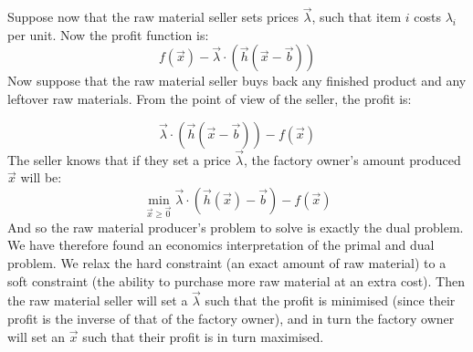\documentclass[../Main.tex]{subfiles}
\begin{document}
\begin{example}
    Suppose now that the raw material seller sets prices $\vec{\lambda}$, such that item $i$ costs $\lambda_i$ per unit. Now the profit function is:
    \begin{equation*}
        f(\vec{x}) - \vec{\lambda} \cdot (\vec{h}(\vec{x} - \vec{b}))
    \end{equation*}
    Now suppose that the raw material seller buys back any finished product and any leftover raw materials. From the point of view of the seller, the profit is:

    \begin{equation*}
        \vec{\lambda} \cdot (\vec{h}(\vec{x} - \vec{b})) - f(\vec{x})
    \end{equation*}
    The seller knows that if they set a price $\vec{\lambda}$, the factory owner's amount produced $\vec{x}$ will be:
    \begin{equation*}
        \min_{\vec{x} \geq \vec{0}} \vec{\lambda} \cdot (\vec{h}(\vec{x}) - \vec{b}) - f(\vec{x})
    \end{equation*}
    And so the raw material producer's problem to solve is exactly the dual problem. We have therefore found an economics interpretation of the primal and dual problem. We relax the hard constraint (an exact amount of raw material) to a soft constraint (the ability to purchase more raw material at an extra cost). Then the raw material seller will set a $\vec{\lambda}$ such that the profit is minimised (since their profit is the inverse of that of the factory owner), and in turn the factory owner will set an $\vec{x}$ such that their profit is in turn maximised.
\end{example}
\end{document}

